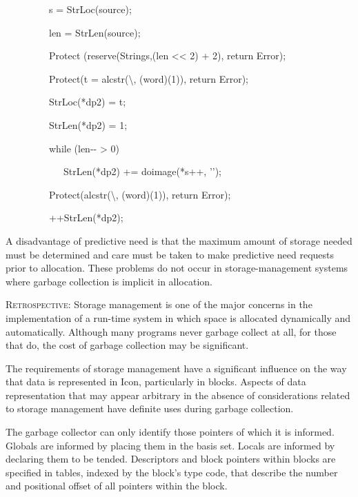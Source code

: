 {\ttfamily\mdseries
\ \ \ \ \ \ \ \ \ s = StrLoc(source);
}

{\ttfamily\mdseries
\ \ \ \ \ \ \ \ \ len = StrLen(source);
}

{\ttfamily\mdseries
\ \ \ \ \ \ \ \ \ Protect (reserve(Strings,(len {\textless}{\textless} 2) + 2), return Error);
}

{\ttfamily\mdseries
\ \ \ \ \ \ \ \ \ Protect(t = alcstr({\textquotedbl}{\textbackslash}{\textquotedbl}{\textquotedbl}, (word)(1)), return
Error);}

{\ttfamily\mdseries
\ \ \ \ \ \ \ \ \ StrLoc(*dp2) = t;
}

{\ttfamily\mdseries
\ \ \ \ \ \ \ \ \ StrLen(*dp2) = 1;
}

{\ttfamily\mdseries
\ \ \ \ \ \ \ \ \ while (len-{}- {\textgreater} 0)
}

{\ttfamily\mdseries
\ \ \ \ \ \ \ \ \ \ \ \ StrLen(*dp2) += doimage(*s++, '{\textquotedbl}');
}

{\ttfamily\mdseries
\ \ \ \ \ \ \ \ \ Protect(alcstr({\textquotedbl}{\textbackslash}{\textquotedbl}{\textquotedbl}, (word)(1)), return
Error);}

{\ttfamily\mdseries
\ \ \ \ \ \ \ \ \ ++StrLen(*dp2);}


\bigskip


A disadvantage of predictive need is that the maximum amount of
storage needed must be determined and care must be taken to make
predictive need requests prior to allocation. These problems do not
occur in storage-management systems where garbage collection is
implicit in allocation.


\textsc{Retrospective}: Storage management is one of the major
concerns in the implementation of a run-time system in which space is
allocated dynamically and automatically. Although many programs never
garbage collect at all, for those that do, the cost of garbage
collection may be significant.

The requirements of storage management have a significant influence on
the way that data is represented in Icon, particularly in
blocks. Aspects of data representation that may appear arbitrary in
the absence of considerations related to storage management have
definite uses during garbage collection.

The garbage collector can only identify those pointers of which it is
informed. Globals are informed by placing them in the basis
set. Locals are informed by declaring them to be tended. Descriptors
and block pointers within blocks are specified in tables, indexed by
the block's type code, that describe the number and positional offset
of all pointers within the block.

